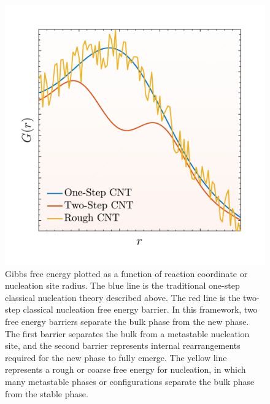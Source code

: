\begin{figure}[h]
	\centering
	\includegraphics[width = .5\textwidth]{./Figures/CNT/extended_cnt.pdf}
	\caption[Gibbs free energy plotted as a function of reaction coordinate or nucleation site radius.  The blue line is the traditional one-step classical nucleation theory described above.  The red line is the two-step classical nucleation free energy barrier.  In this framework, two free energy barriers separate the bulk phase from the new phase.  The first barrier separates the bulk from a metastable nucleation site, and the second barrier represents internal rearrangements required for the new phase to fully emerge.  The yellow line represents a rough or coarse free energy for nucleation, in which many metastable phases or configurations separate the bulk phase from the stable phase.]{Gibbs free energy plotted as a function of reaction coordinate or nucleation site radius.  The blue line is the traditional one-step classical nucleation theory described above.  The red line is the two-step classical nucleation free energy barrier.  In this framework, two free energy barriers separate the bulk phase from the new phase.  The first barrier separates the bulk from a metastable nucleation site, and the second barrier represents internal rearrangements required for the new phase to fully emerge.  The yellow line represents a rough or coarse free energy for nucleation, in which many metastable phases or configurations separate the bulk phase from the stable phase. \cite{DeYoreo2016}}
	\label{extended_cnt}
\end{figure}

